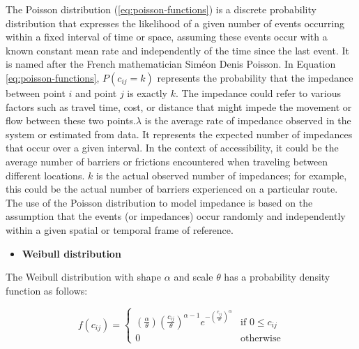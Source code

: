 \documentclass[
11pt, %
oneside, %
english, %
singlespacing, %
]{macthesis} %
\def\tightlist{}
\begin{document}
The Poisson distribution (\eqref{eq:poisson-functions}) is a discrete probability distribution that expresses the likelihood of a given number of events occurring within a fixed interval of time or space, assuming these events occur with a known constant mean rate and independently of the time since the last event. It is named after the French mathematician Siméon Denis Poisson. In Equation \eqref{eq:poisson-functions}, \(P(c_{ij} =k)\) represents the probability that the impedance between point \(i\) and point \(j\) is exactly \(k\). The impedance could refer to various factors such as travel time, cost, or distance that might impede the movement or flow between these two points.\(\lambda\) is the average rate of impedance observed in the system or estimated from data. It represents the expected number of impedances that occur over a given interval. In the context of accessibility, it could be the average number of barriers or frictions encountered when traveling between different locations. \(k\) is the actual observed number of impedances; for example, this could be the actual number of barriers experienced on a particular route. The use of the Poisson distribution to model impedance is based on the assumption that the events (or impedances) occur randomly and independently within a given spatial or temporal frame of reference.

\begin{itemize}
\tightlist
\item
  \textbf{Weibull distribution}
\end{itemize}

The Weibull distribution with shape \(\alpha\) and scale \(\theta\) has a probability density function as follows:

\begin{equation}
f(c_{ij}) =
\begin{cases}
\left( \frac{\alpha}{\theta}\right) \left( \frac{c_{ij}}{\theta}\right)^{\alpha - 1} e^{-\left(\frac{c_{ij}}{\theta}\right)^\alpha} & \text{if } 0 \leq c_{ij} \\
0 & \text{otherwise}
\end{cases}
\label{eq:weibull-functions}
\end{equation}
\end{document}
